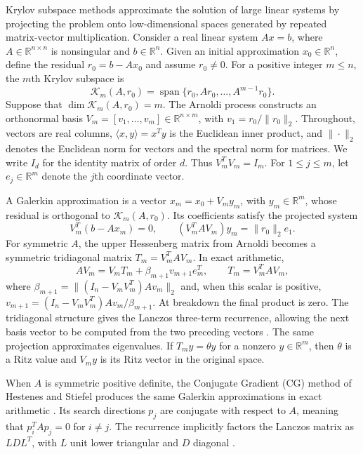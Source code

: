 \documentclass[11pt]{article}
\theoremstyle{definition}
\newcommand{\R}{\mathbb{R}}
\begin{document}
Krylov subspace methods approximate the solution of large linear systems by
projecting the problem onto low-dimensional spaces generated by repeated
matrix-vector multiplication. Consider a real linear system $Ax=b$, where
$A\in\R^{n\times n}$ is nonsingular and $b\in\R^n$.
Given an initial approximation $x_0\in\R^n$, define the residual
$r_0=b-Ax_0$ and assume $r_0\ne0$. For a positive integer $m\le n$, the
$m$th Krylov subspace is
\begin{equation}
 \mathcal K_m(A,r_0)
 =\operatorname{span}\{r_0,Ar_0,\ldots,A^{m-1}r_0\}.
 \label{eq:krylov-space}
\end{equation}
Suppose that $\dim\mathcal K_m(A,r_0)=m$. The Arnoldi process constructs an
orthonormal basis $V_m=[v_1,\ldots,v_m]\in\R^{n\times m}$, with
$v_1=r_0/\|r_0\|_2$. Throughout, vectors are real columns,
$\langle x,y\rangle=x^Ty$ is the Euclidean inner product, and $\|\cdot\|_2$
denotes the Euclidean norm for vectors and the spectral norm for matrices.
We write $I_d$ for the identity matrix of order $d$. Thus $V_m^TV_m=I_m$.
For $1\le j\le m$, let $e_j\in\R^m$ denote the $j$th coordinate vector.

A Galerkin approximation is a vector $x_m=x_0+V_my_m$, with
$y_m\in\R^m$, whose residual is orthogonal to $\mathcal K_m(A,r_0)$.
Its coefficients satisfy the projected system
\begin{equation}
 V_m^T(b-Ax_m)=0,
 \qquad (V_m^TAV_m)y_m=\|r_0\|_2e_1.
 \label{eq:galerkin-intro}
\end{equation}
For symmetric $A$, the upper Hessenberg matrix from Arnoldi becomes a
symmetric tridiagonal matrix $T_m=V_m^TAV_m$. In exact arithmetic,
\begin{equation}
 AV_m=V_mT_m+\beta_{m+1}v_{m+1}e_m^T,
 \qquad T_m=V_m^TAV_m,
 \label{eq:lanczos-relation}
\end{equation}
where $\beta_{m+1}=\|(I_n-V_mV_m^T)Av_m\|_2$ and, when this scalar is
positive, $v_{m+1}=(I_n-V_mV_m^T)Av_m/\beta_{m+1}$.
At breakdown the final product is zero. The tridiagonal structure gives the
Lanczos three-term recurrence, allowing the next basis vector to be computed
from the two preceding vectors \cite{Paige1976}.
The same projection approximates eigenvalues. If $T_my=\theta y$ for a
nonzero $y\in\R^m$, then $\theta$ is a Ritz value and $V_my$ is its Ritz
vector in the original space.

When $A$ is symmetric positive definite, the Conjugate Gradient (CG) method
of Hestenes and Stiefel produces the same Galerkin approximations in exact
arithmetic \cite{HestenesStiefel1952,Saad2003}. Its search directions $p_j$
are conjugate with respect to $A$, meaning that $p_i^TAp_j=0$ for $i\ne j$.
The recurrence implicitly factors the Lanczos matrix as $LDL^T$, with $L$
unit lower triangular and $D$ diagonal \cite{PaigeSaunders1975}.
\end{document}
